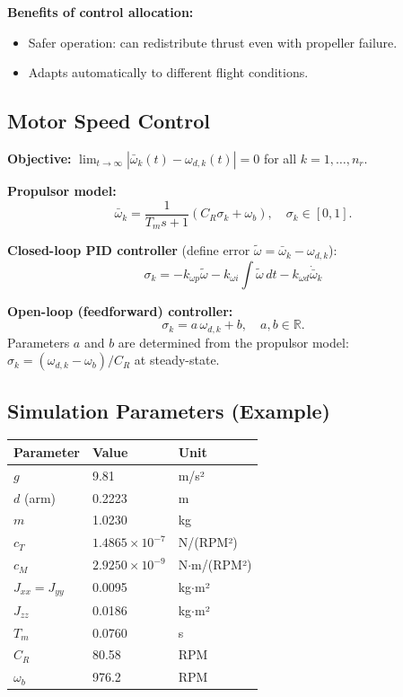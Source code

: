 \documentclass[11pt,a4paper]{article}
\newcommand{\R}{\mathbb{R}}
\begin{document}
\textbf{Benefits of control allocation:}
\begin{itemize}
  \item Safer operation: can redistribute thrust even with propeller failure.
  \item Adapts automatically to different flight conditions.
\end{itemize}

\subsection{Motor Speed Control}

\textbf{Objective:} $\displaystyle\lim_{t\to\infty}|\bar\omega_k(t)-\omega_{d,k}(t)|=0$ for all $k=1,\ldots,n_r$.

\textbf{Propulsor model:}
\[
\bar\omega_k = \frac{1}{T_ms+1}(C_R\sigma_k+\omega_b),\quad \sigma_k\in[0,1].
\]

\textbf{Closed-loop PID controller} (define error $\tilde\omega = \bar\omega_k - \omega_{d,k}$):
\[
\boxed{
\sigma_k = -k_{\omega p}\tilde\omega - k_{\omega i}\int\tilde\omega\,dt - k_{\omega d}\dot{\bar\omega}_k
}
\]

\textbf{Open-loop (feedforward) controller:}
\[
\sigma_k = a\,\omega_{d,k} + b,\quad a,b\in\R.
\]
Parameters $a$ and $b$ are determined from the propulsor model: $\sigma_k = (\omega_{d,k} - \omega_b)/C_R$ at steady-state.

\subsection{Simulation Parameters (Example)}

\begin{center}
\begin{tabular}{lll}
\toprule
Parameter & Value & Unit \\
\midrule
$g$ & 9.81 & m/s² \\
$d$ (arm) & 0.2223 & m \\
$m$ & 1.0230 & kg \\
$c_T$ & $1.4865\times10^{-7}$ & N/(RPM²) \\
$c_M$ & $2.9250\times10^{-9}$ & N$\cdot$m/(RPM²) \\
$J_{xx}=J_{yy}$ & 0.0095 & kg$\cdot$m² \\
$J_{zz}$ & 0.0186 & kg$\cdot$m² \\
$T_m$ & 0.0760 & s \\
$C_R$ & 80.58 & RPM \\
$\omega_b$ & 976.2 & RPM \\
\bottomrule
\end{tabular}
\end{center}
\end{document}
